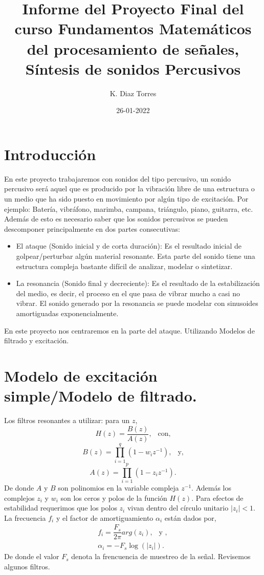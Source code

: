 \documentclass[11pt]{amsart}
\newcommand{\truncateit}[1]{\truncate{0.8\textwidth}{#1}}
\newcommand{\scititle}[1]{\title[\truncateit{#1}]{#1}}
\theoremstyle{plain}
\theoremstyle{definition}
\begin{document}
\scititle{Informe del Proyecto Final del curso Fundamentos Matemáticos del procesamiento de señales, Síntesis de sonidos Percusivos}
\author{K. Diaz Torres}
\date{26-01-2022}
\maketitle











\section{Introducción}

 En este proyecto trabajaremos con sonidos del tipo percusivo, un sonido percusivo será aquel que es producido por la vibración libre de una estructura o un medio que ha sido puesto en movimiento por algún tipo de excitación. Por ejemplo: Batería, vibráfono, marimba, campana, triángulo, piano, guitarra, etc. Además de esto es necesario saber que los sonidos percusivos se pueden descomponer principalmente en dos partes consecutivas:\\
\begin{itemize}
\item El ataque (Sonido inicial y de corta duración): Es el resultado inicial de golpear/perturbar algún material resonante. Esta parte del sonido tiene una estructura compleja bastante difícil de analizar, modelar o sintetizar. 
\item La resonancia (Sonido final y decreciente): Es el resultado de la estabilización del medio, es decir, el proceso en el que pasa de vibrar mucho a casi no vibrar. El sonido generado por la resonancia se puede modelar con sinusoides amortiguadas exponencialmente.
\end{itemize}
 En este proyecto nos centraremos en la parte del ataque. Utilizando Modelos de filtrado y excitación.



\section{Modelo de excitación simple/Modelo de filtrado.}
Los filtros resonantes a utilizar: para un $z$,
$$
H(z)=\frac{B(z)}{A(z)}, \ \ \text{ con,}
$$
$$
B(z)= \prod_{i=1}^{q}(1-w_iz^{-1}), \ \ \text{ y,}
$$
$$
A(z)=\prod_{i=1}^{p}(1-z_iz^{-1}).
$$
De donde $A$ y $B$ son polinomios en la variable compleja $z^{-1}$. Además los complejos $z_i$ y $w_i$ son los ceros y polos de la función $H(z)$. Para efectos de estabilidad requerimos que los polos $z_i$ vivan dentro del círculo unitario $|z_i|<1$. \\
La frecuencia $f_i$ y el factor de amortiguamiento $\alpha_i$ están dados por,
\begin{eqnarray}
f_i=\dfrac{F_s}{2 \pi} arg(z_i), \ \ \text{ y }, \\
\alpha_i = -F_s \log(|z_i|).
\end{eqnarray}
De donde el valor $F_s$ denota la frencuencia de muestreo de la señal. Revisemos algunos filtros.
\end{document}
